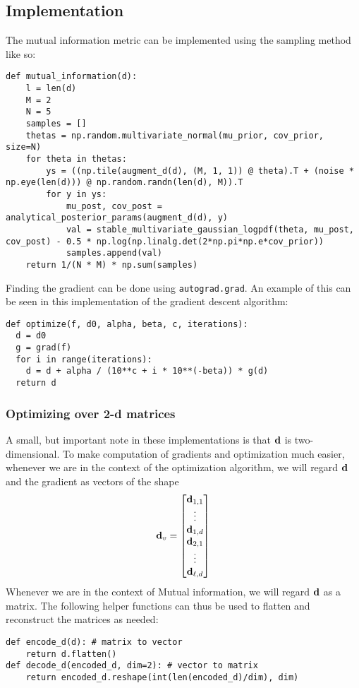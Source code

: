 \subsection{Implementation}
The mutual information metric can be implemented using the sampling method like so:
\begin{verbatim}
def mutual_information(d):
    l = len(d)
    M = 2
    N = 5
    samples = []
    thetas = np.random.multivariate_normal(mu_prior, cov_prior, size=N)
    for theta in thetas:
        ys = ((np.tile(augment_d(d), (M, 1, 1)) @ theta).T + (noise * np.eye(len(d))) @ np.random.randn(len(d), M)).T
        for y in ys:
            mu_post, cov_post = analytical_posterior_params(augment_d(d), y)
            val = stable_multivariate_gaussian_logpdf(theta, mu_post, cov_post) - 0.5 * np.log(np.linalg.det(2*np.pi*np.e*cov_prior))
            samples.append(val)
    return 1/(N * M) * np.sum(samples)
\end{verbatim}

Finding the gradient can be done using \texttt{autograd.grad}. 
An example of this can be seen in this implementation of the gradient descent algorithm:
\begin{verbatim}
def optimize(f, d0, alpha, beta, c, iterations):
  d = d0
  g = grad(f)
  for i in range(iterations):
    d = d + alpha / (10**c + i * 10**(-beta)) * g(d)
  return d
\end{verbatim}

\subsubsection{Optimizing over 2-d matrices}
A small, but important note in these implementations is that $\mathbf{d}$ is two-dimensional.
To make computation of gradients and optimization much easier, whenever we are in the context of the optimization algorithm, we will regard $\mathbf{d}$ and the gradient as vectors of the shape
$$\mathbf{d}_v = \begin{bmatrix}\mathbf{d}_{1,1} \\ \vdots  \\ \mathbf{d}_{1,d} \\ \mathbf{d}_{2,1} \\ \vdots \\ \mathbf{d}_{\ell, d} \end{bmatrix}$$
Whenever we are in the context of Mutual information, we will regard $\mathbf{d}$ as a matrix. The following helper functions can thus be used to flatten and reconstruct the matrices as needed:
\begin{verbatim}
def encode_d(d): # matrix to vector
    return d.flatten()
def decode_d(encoded_d, dim=2): # vector to matrix
    return encoded_d.reshape(int(len(encoded_d)/dim), dim)
\end{verbatim}


